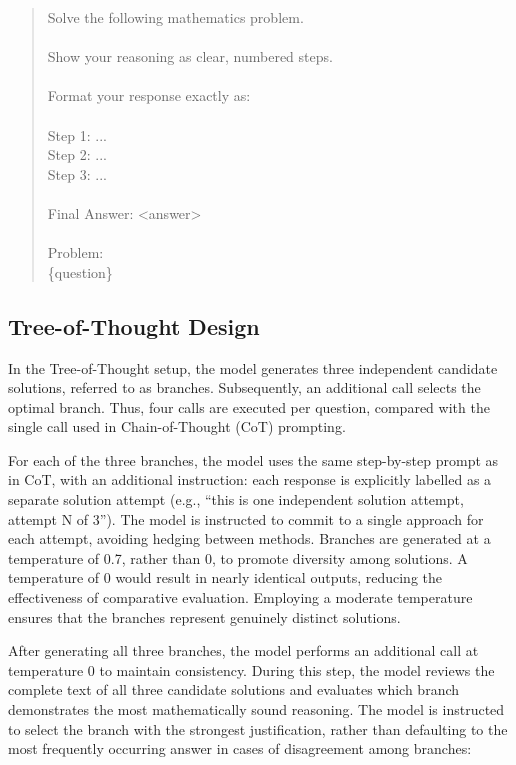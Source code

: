 \begin{quote}
\ttfamily\small
Solve the following mathematics problem.\\
\\
Show your reasoning as clear, numbered steps.\\
\\
Format your response exactly as:\\
\\
Step 1: ...\\
Step 2: ...\\
Step 3: ...\\
\\
Final Answer: <answer>\\
\\
Problem:\\
\{question\}
\end{quote}

\subsection{Tree-of-Thought Design}
\label{sec:tot-design}

In the Tree-of-Thought setup, the model generates three independent
candidate solutions, referred to as branches. Subsequently, an
additional call selects the optimal branch. Thus, four calls are
executed per question, compared with the single call used in
Chain-of-Thought (CoT) prompting.

For each of the three branches, the model uses the same step-by-step
prompt as in CoT, with an additional instruction: each response is
explicitly labelled as a separate solution attempt (e.g., ``this is one
independent solution attempt, attempt N of 3''). The model is instructed
to commit to a single approach for each attempt, avoiding hedging
between methods. Branches are generated at a temperature of 0.7, rather
than 0, to promote diversity among solutions. A temperature of 0 would
result in nearly identical outputs, reducing the effectiveness of
comparative evaluation. Employing a moderate temperature ensures that
the branches represent genuinely distinct solutions.

After generating all three branches, the model performs an additional
call at temperature 0 to maintain consistency. During this step, the
model reviews the complete text of all three candidate solutions and
evaluates which branch demonstrates the most mathematically sound
reasoning. The model is instructed to select the branch with the
strongest justification, rather than defaulting to the most frequently
occurring answer in cases of disagreement among branches:

